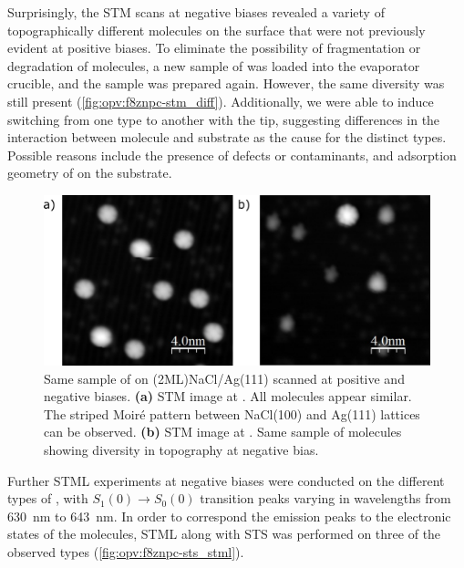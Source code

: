 
Surprisingly, the \ac{STM} scans at negative biases revealed a variety of topographically different molecules on the surface that were not previously evident at positive biases. To eliminate the possibility of fragmentation or degradation of molecules, a new sample of  was loaded into the evaporator crucible, and the sample was prepared again. However, the same diversity was still present (\autoref{fig:opv:f8znpc-stm_diff}). Additionally, we were able to induce switching from one type to another with the tip, suggesting differences in the interaction between molecule and substrate as the cause for the distinct types. Possible reasons include the presence of defects or contaminants, and adsorption geometry of  on the substrate.


\begin{figure} [H]
    \centering
    \includegraphics[width=\textwidth]{pictures/diversity.png}
    \caption{Same sample of  on (2ML)NaCl/Ag(111) scanned at positive and negative biases. \textbf{(a)} STM image at . All molecules appear similar. The striped Moir\'e pattern between NaCl(100) and Ag(111) lattices can be observed. \textbf{(b)} STM image at . Same sample of molecules showing diversity in topography at negative bias. }
    \label{fig:opv:f8znpc-stm_diff}
\end{figure}

Further \ac{STML} experiments at negative biases were conducted on the different types of , with $S_1(0) \rightarrow S_0(0)$ transition peaks varying in wavelengths from \SI{630}{nm} to \SI{643}{nm}. In order to correspond the emission peaks to the electronic states of the molecules, \ac{STML} along with \ac{STS} was performed on three of the observed types (\autoref{fig:opv:f8znpc-sts_stml}). 


